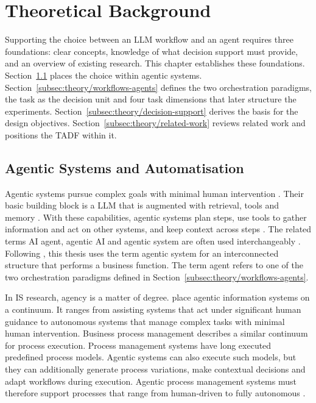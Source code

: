 \clearpage
\section{Theoretical Background}
\label{sec:Background}
Supporting the choice between an LLM workflow and an agent requires three foundations: clear concepts, knowledge of what decision support must provide, and an overview of existing research. This chapter establishes these foundations. Section~\ref{subsec:theory/agentic-systems} places the choice within agentic systems. Section~\ref{subsec:theory/workflows-agents} defines the two orchestration paradigms, the task as the decision unit and four task dimensions that later structure the experiments. Section~\ref{subsec:theory/decision-support} derives the basis for the design objectives. Section~\ref{subsec:theory/related-work} reviews related work and positions the TADF within it.

\subsection{Agentic Systems and Automatisation}
\label{subsec:theory/agentic-systems}
Agentic systems pursue complex goals with minimal human intervention \parencite{acharyaAgenticAIAutonomous2025}. Their basic building block is a LLM that is augmented with retrieval, tools and memory \parencite{schluntzBuildingEffectiveAI2024}. With these capabilities, agentic systems plan steps, use tools to gather information and act on other systems, and keep context across steps \parencite{dwivediAgenticAISystems2026,sapkotaAIAgentsVs2026}. The related terms AI agent, agentic AI and agentic system are often used interchangeably \parencite{hughesAIAgentsAgentic2025}. Following \textcite{hughesAIAgentsAgentic2025}, this thesis uses the term agentic system for an interconnected structure that performs a business function. The term agent refers to one of the two orchestration paradigms defined in Section~\ref{subsec:theory/workflows-agents}.

In IS research, agency is a matter of degree. \textcite{holldackAgenticInformationSystems2026} place agentic information systems on a continuum. It ranges from assisting systems that act under significant human guidance to autonomous systems that manage complex tasks with minimal human intervention. Business process management describes a similar continuum for process execution. Process management systems have long executed predefined process models. Agentic systems can also execute such models, but they can additionally generate process variations, make contextual decisions and adapt workflows during execution. Agentic process management systems must therefore support processes that range from human-driven to fully autonomous \parencite{dumasAgenticBusinessProcess2026}.

